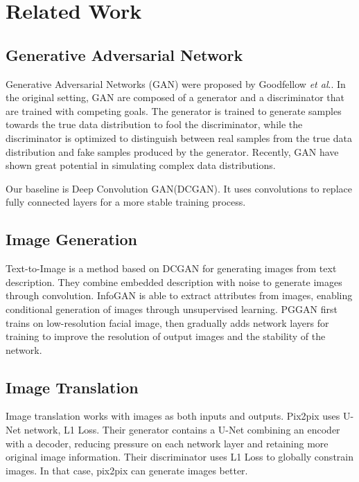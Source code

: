 \section{Related Work}


\subsection{Generative Adversarial Network}

Generative Adversarial Networks (GAN) were proposed by Goodfellow \emph{et al}..
In the original setting, GAN are composed of a generator and a discriminator that are trained with competing goals.
The generator is trained to generate samples towards the true data distribution to fool the discriminator,
    while the discriminator is optimized to distinguish between real samples
    from the true data distribution and fake samples produced by the generator.
Recently, GAN have shown great potential in simulating complex data distributions.



Our baseline is Deep Convolution GAN(DCGAN).
It uses convolutions to replace fully connected layers for a more stable training process.




\subsection{Image Generation}

Text-to-Image is a method based on DCGAN for generating images from text description.
They combine embedded description with noise to generate images through convolution.
InfoGAN is able to extract attributes from images,
    enabling conditional generation of images through unsupervised learning.
PGGAN first trains on low-resolution facial image,
    then gradually adds network layers for training to improve the resolution of output images and the stability of the network.

\subsection{Image Translation}
Image translation works with images as both inputs and outputs.
Pix2pix uses U-Net network, L1 Loss.
Their generator contains a U-Net combining an encoder with a decoder,
    reducing pressure on each network layer and retaining more original image information.
Their discriminator uses L1 Loss to globally constrain images.
In that case, pix2pix can generate images better.

